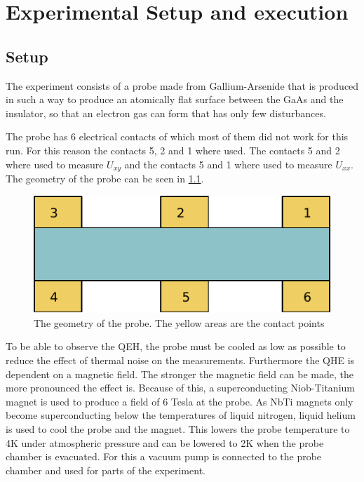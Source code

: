 \chapter{Experimental Setup and execution}
\section{Setup}
The experiment consists of a probe made from Gallium-Arsenide that is produced in such a way to produce an atomically flat surface between the GaAs
and the insulator, so that an electron gas can form that has only few disturbances.

The probe has 6 electrical contacts of which most of them did not work for this run. For this reason the contacts 5, 2 and 1 where used. The contacts
5 and 2 where used to measure $U_{xy}$ and the contacts 5 and 1 where used to measure $U_{xx}$. The geometry of the probe can be seen in
\ref{fig:probe}.
\begin{figure}[tb]
	\includegraphics[width=\textwidth]{fig/QEH-probe.pdf}
	\caption{The geometry of the probe. The yellow areas are the contact points}
	\label{fig:probe}
\end{figure}

To be able to observe the QEH, the probe must be cooled as low as possible to reduce the effect of thermal noise on the measurements. Furthermore the
QHE is dependent on a magnetic field. The stronger the magnetic field can be made, the more pronounced the effect is. Because of this, a
superconducting Niob-Titanium magnet is used to produce a field of 6 Tesla at the probe. As NbTi magnets only become superconducting below the
temperatures of liquid nitrogen, liquid helium is used to cool the probe and the magnet. This lowers the probe temperature to 4K under atmospheric
pressure and can be lowered to 2K when the probe chamber is evacuated. For this a vacuum pump is connected to the probe chamber and used for parts of
the experiment.

